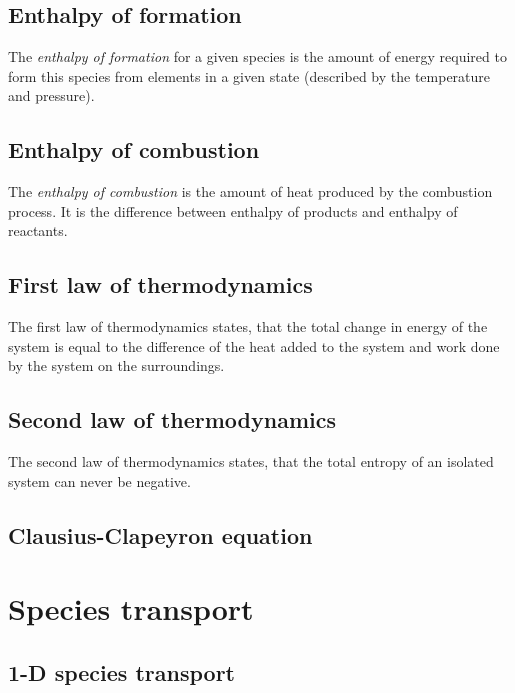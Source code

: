 \documentclass[10pt,twocolumn]{article}
\begin{document}
\subsection{Enthalpy of formation}

The \textit{enthalpy of formation} for a given species is the amount of energy required to form this species from elements in a given state (described by the temperature and pressure).


\subsection{Enthalpy of combustion}

The \textit{enthalpy of combustion} is the amount of heat produced by the combustion process. It is the difference between enthalpy of products and enthalpy of reactants.

\subsection{First law of thermodynamics}

The first law of thermodynamics states, that the total change in energy of the system is equal to the difference of the heat added to the system and work done by the system on the surroundings.



\subsection{Second law of thermodynamics}

The second law of thermodynamics states, that the total entropy of an isolated system can never be negative.

\subsection{Clausius-Clapeyron equation}



\section{Species transport}



\subsection{1-D species transport}
\end{document}
